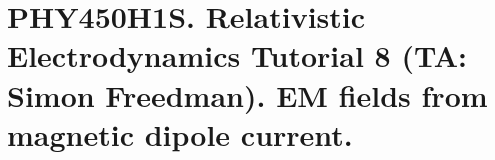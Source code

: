 
%

\chapter{PHY450H1S.  Relativistic Electrodynamics Tutorial 8 (TA: Simon Freedman).  EM fields from magnetic dipole current.}
\label{chap:relativisticElectrodynamicsT8}
{}
\date{Mar 23, 2011}

\beginArtWithToc

\section{}

\EndNoBibArticle
